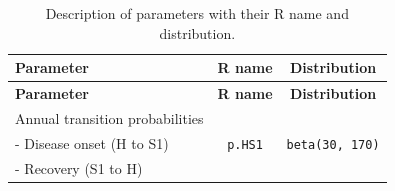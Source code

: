 \documentclass[]{article}
\begin{document}
\begin{longtable}[]{@{}lcc@{}}
\caption{\label{tab:parameters PSA} Description of parameters with their
R name and distribution.}\tabularnewline
\toprule
\begin{minipage}[b]{0.43\columnwidth}\raggedright\strut
\textbf{Parameter}\strut
\end{minipage} & \begin{minipage}[b]{0.18\columnwidth}\centering\strut
\textbf{R name}\strut
\end{minipage} & \begin{minipage}[b]{0.20\columnwidth}\centering\strut
\textbf{Distribution}\strut
\end{minipage}\tabularnewline
\midrule
\endfirsthead
\toprule
\begin{minipage}[b]{0.43\columnwidth}\raggedright\strut
\textbf{Parameter}\strut
\end{minipage} & \begin{minipage}[b]{0.18\columnwidth}\centering\strut
\textbf{R name}\strut
\end{minipage} & \begin{minipage}[b]{0.20\columnwidth}\centering\strut
\textbf{Distribution}\strut
\end{minipage}\tabularnewline
\midrule
\endhead
\begin{minipage}[t]{0.43\columnwidth}\raggedright\strut
Annual transition probabilities\strut
\end{minipage} & \begin{minipage}[t]{0.18\columnwidth}\centering\strut
\strut
\end{minipage} & \begin{minipage}[t]{0.20\columnwidth}\centering\strut
\strut
\end{minipage}\tabularnewline
\begin{minipage}[t]{0.43\columnwidth}\raggedright\strut
- Disease onset (H to S1)\strut
\end{minipage} & \begin{minipage}[t]{0.18\columnwidth}\centering\strut
\texttt{p.HS1}\strut
\end{minipage} & \begin{minipage}[t]{0.20\columnwidth}\centering\strut
\texttt{beta(30,\ 170)}\strut
\end{minipage}\tabularnewline
\begin{minipage}[t]{0.43\columnwidth}\raggedright\strut
- Recovery (S1 to H)\strut
\end{minipage} & \begin{minipage}[t]{0.18\columnwidth}\centering\strut

\end{minipage}
\end{longtable}
\end{document}
